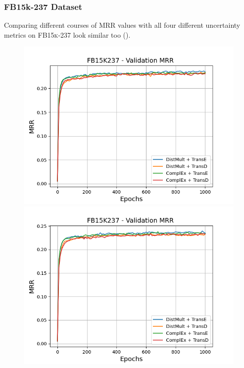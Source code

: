 \subsubsection{FB15k-237 Dataset}
\label{subsubsec:measures_fb15k237}
%
Comparing different courses of MRR values with all four different uncertainty metrics on \textsc{FB15k-237} look similar too ().
\begin{figure}
    \centering
    \begin{minipage}{.5\textwidth}
      \centering
      \includegraphics[width=0.9\linewidth]{figures/results/gan_train/not_pretrained/uncertainty/max_distribution/entropy/fb15k237/1k_epochs/uncertainty_fb15k237_mrrs.png}
    \end{minipage}%
    \begin{minipage}{.5\textwidth}
      \centering
      \includegraphics[width=0.9\linewidth]{figures/results/gan_train/not_pretrained/uncertainty/max_distribution/least_confidence/fb15k237/uncertainty_fb15k237_mrrs.png}

\end{minipage}
\end{figure}
